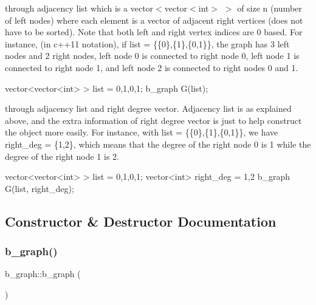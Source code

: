 \begin{DoxyEnumerate}
\item through adjacency list which is a vector$<$vector$<$int$>$ $>$ of size n (number of left nodes) where each element is a vector of adjacent right vertices (does not have to be sorted). Note that both left and right vertex indices are 0 based. For instance, (in c++11 notation), if list = \{\{0\},\{1\},\{0,1\}\}, the graph has 3 left nodes and 2 right nodes, left node 0 is connected to right node 0, left node 1 is connected to right node 1, and left node 2 is connected to right nodes 0 and 1. \begin{DoxyVerb}vector<vector<int> > list = {{0},{1},{0,1}};
b_graph G(list);
\end{DoxyVerb}

\item through adjacency list and right degree vector. Adjacency list is as explained above, and the extra information of right degree vector is just to help construct the object more easily. For instance, with list = \{\{0\},\{1\},\{0,1\}\}, we have right\+\_\+deg = \{1,2\}, which means that the degree of the right node 0 is 1 while the degree of the right node 1 is 2. \begin{DoxyVerb}vector<vector<int> > list = {{0},{1},{0,1}};
vector<int> right_deg = {1,2}
b_graph G(list, right_deg);\end{DoxyVerb}
 
\end{DoxyEnumerate}

\subsection{Constructor \& Destructor Documentation}
\mbox{\label{classb__graph_a83ebab7ff22a3cf19c0cf62de3f8b306}} 
\subsubsection{\texorpdfstring{b\+\_\+graph()}{b\_graph()}\hspace{0.1cm}{\footnotesize\ttfamily [1/3]}}
{\footnotesize\ttfamily b\+\_\+graph\+::b\+\_\+graph (\begin{DoxyParamCaption}{ }\end{DoxyParamCaption})\hspace{0.3cm}{\ttfamily [inline]}}



